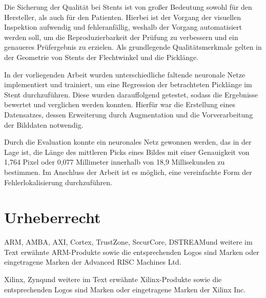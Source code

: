 Die Sicherung der Qualität bei Stents ist von großer Bedeutung sowohl für den Hersteller, als auch für den Patienten. Hierbei ist der Vorgang der visuellen Inspektion aufwendig und fehleranfällig, weshalb der Vorgang automatisiert werden soll, um die Reproduzierbarkeit der Prüfung zu verbessern und ein genaueres Prüfergebnis zu erzielen. Als grundlegende Qualitätsmerkmale gelten in der Geometrie von Stents der Flechtwinkel und die Picklänge.

\mypar In der vorliegenden Arbeit wurden unterschiedliche faltende neuronale Netze implementiert und trainiert, um eine Regression der betrachteten Picklänge im Stent durchzuführen. Diese wurden darauffolgend getestet, sodass die Ergebnisse bewertet und verglichen werden konnten. Hierfür war die Erstellung eines Datensatzes, dessen Erweiterung durch Augmentation und die Vorverarbeitung der Bilddaten notwendig.

\mypar Durch die Evaluation konnte ein neuronales Netz gewonnen werden, das in der Lage ist, die Länge des mittleren Picks eines Bildes mit einer Genauigkeit von 1,764 Pixel oder 0,077 Millimeter innerhalb von 18,9 Millisekunden zu bestimmen. Im Anschluss der Arbeit ist es möglich, eine vereinfachte Form der Fehlerlokalisierung durchzuführen. 

\cleardoublepage

\chapter*{Urheberrecht}

ARM\TReg, AMBA\TReg, AXI\TTra, Cortex\TTra, TrustZone\TTra, SecurCore\TTra  , DSTREAM\TTra und weitere im Text erwähnte ARM-Produkte sowie die entsprechenden Logos sind Marken oder eingetragene Marken der Advanced RISC Machines Ltd.\par
\vspace{0.5cm}
Xilinx\TReg, Zynq\TTra und weitere im Text erwähnte Xilinx-Produkte sowie die entsprechenden Logos sind Marken oder eingetragene Marken der Xilinx Inc.\par
\vspace{0.5cm}